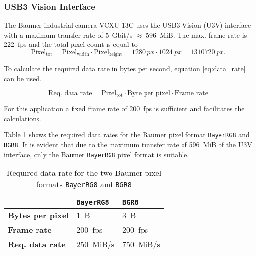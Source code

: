 \subsubsection{USB3 Vision Interface}
\label{subsubsec:usb3_vision_interface}

The Baumer industrial camera VCXU-13C uses the USB3 Vision (U3V) interface with a maximum transfer rate of \SI{5}{Gbit/s} $\approx$ \SI{596}{MiB}.
The max. frame rate is \SI{222}{fps} and the total pixel count is equal to
\[
\text{Pixel}_\text{tot} = \text{Pixel}_\text{width} \cdot \text{Pixel}_\text{height} = \SI{1280}{px} \cdot \SI{1024}{px} = \SI{1310720}{px}.
\]

To calculate the required data rate in bytes per second, equation \ref{eq:data_rate} can be used.

\begin{equation}
  \text{Req. data rate} = \text{Pixel}_\text{tot} \cdot \text{Byte per pixel} \cdot \text{Frame rate}
  \label{eq:data_rate}
\end{equation}

For this application a fixed frame rate of \SI{200}{fps} is sufficient and facilitates the calculations.

Table \ref{tab:data_rates} shows the required data rates for the Baumer pixel format \texttt{BayerRG8} and \texttt{BGR8}.
It is evident that due to the maximum transfer rate of \SI{596}{MiB} of the U3V interface, only the Baumer \texttt{BayerRG8} pixel format is suitable.

\begin{table}[h]
  \caption{Required data rate for the two Baumer pixel formats \texttt{BayerRG8} and \texttt{BGR8}}
  \label{tab:data_rates}
  \centering
  \begin{tabular}{lll}
    \toprule
     & \textbf{\texttt{BayerRG8}} & \textbf{\texttt{BGR8}} \\
    \midrule
    \textbf{Bytes per pixel} & \SI{1}{B} & \SI{3}{B} \\
    \textbf{Frame rate} & \SI{200}{fps} & \SI{200}{fps} \\
    \textbf{Req. data rate} & \SI{250}{MiB/s} & \SI{750}{MiB/s} \\
    \bottomrule
  \end{tabular}
\end{table}
